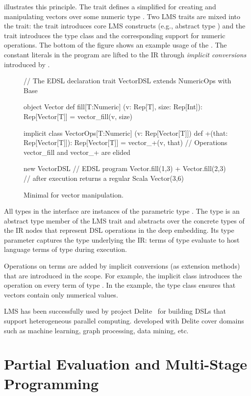  illustrates this principle.  The trait
 defines a simplified \edsl for creating and
manipulating vectors over some numeric type .  Two LMS traits
are mixed into the  trait: the  trait
introduces core LMS constructs (e.g., abstract type )
and the  trait introduces the  type
class and the corresponding support for numeric operations.  The
bottom of the figure shows an example usage of the \edsl. The constant
literals in the program are lifted to the IR through \emph{implicit
  conversions} introduced by .

\begin{figure}
\begin{listingtiny}
// The EDSL declaration
trait VectorDSL extends NumericOps with Base {
  object Vector {
    def fill[T:Numeric]
      (v: Rep[T], size: Rep[Int]): Rep[Vector[T]] =
      vector_fill(v, size)
  }

  implicit class VectorOps[T:Numeric]
    (v: Rep[Vector[T]]) {
    def +(that: Rep[Vector[T]]): Rep[Vector[T]] =
      vector_+(v, that)
  }
  // Operations vector_fill and vector_+ are elided
}

new VectorDSL { // EDSL program
  Vector.fill(1,3) + Vector.fill(2,3)
} // after execution returns a regular Scala Vector(3,6)
\end{listingtiny}
\caption{\label{lst:lms} Minimal \edsl for vector manipulation.}
\end{figure}

All types in the  interface are instances of the
parametric type .  The  type is an abstract
type member of the  LMS trait and abstracts over the
concrete types of the IR nodes that represent DSL operations in the
deep embedding.  Its type parameter captures the type underlying the
IR: \edsl terms of type  evaluate to host language terms
of type  during \edsl execution.

Operations on  terms are added by implicit conversions (as extension methods) that are introduced in the \edsl scope. For example, the implicit class  introduces the \code{+} operation on every term of type . In the example, the type class  ensures that vectors contain only numerical values.

LMS has been successfully used by project Delite~\cite{brown_heterogeneous_2011,composition-ecoop2013} for building DSLs that support heterogeneous parallel computing. \edsls developed with Delite cover domains
such as machine learning, graph processing, data mining, etc.

\section{Partial Evaluation and Multi-Stage Programming}
\label{sec:partial-evaluation}
